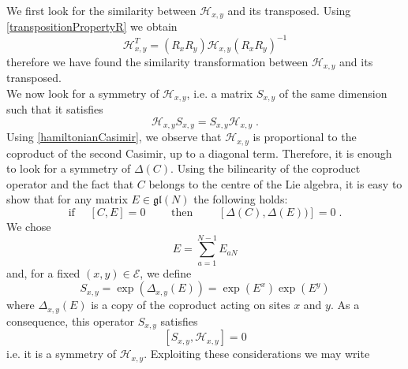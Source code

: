 \documentclass[10pt]{article}
\numberwithin{equation}{section}
\numberwithin{equation}{subsection}
\newcommand{\dt}{\;.}
\begin{document}
We first look for the similarity between $\mathcal{H}_{x,y}$ and its transposed. Using \eqref{transpositionPropertyR} we obtain  
\begin{equation}\label{transpositionPropertyH}
    \mathcal{H}_{x,y}^{T}=\left(R_{x}R_{y}\right)\mathcal{H}_{x,y}\left(R_{x}R_{y}\right)^{-1}
\end{equation}
therefore we have found the similarity transformation between $\mathcal{H}_{x,y}$ and its transposed. \\
We now look for a symmetry of $\mathcal{H}_{x,y}$, i.e. a matrix $S_{x,y}$ of the same dimension such that it satisfies 
\begin{equation}
	\mathcal{H}_{x,y}S_{x,y}=S_{x,y}\mathcal{H}_{x,y}
	\dt
\end{equation}
Using \eqref{hamiltonianCasimir}, we observe that $\mathcal{H}_{x,y}$ is proportional to the coproduct of the second Casimir, up to a diagonal term. Therefore, it is enough to look for a symmetry of $\Delta (C)$. Using the bilinearity of the coproduct operator and the fact that $C$ belongs to the centre of the Lie algebra, it is easy to show that for any matrix $E\in \mathfrak{gl}(N)$ the following holds:
\begin{equation}
 \text{if } \quad	[C,E]=0\qquad  \text{ then }\qquad \left[\Delta (C),\Delta(E)) \right]=0\dt
\end{equation}
We chose 
\begin{equation}
	E=\sum_{a=1}^{N-1}E_{aN}
\end{equation}
and, for a fixed $(x,y)\in \mathcal{E}$, we define
\begin{equation}
	S_{x,y}=\exp{(\Delta_{x,y}(E))}=\exp{(E^{x})}\exp{(E^{y})}
\end{equation}
where $\Delta_{x,y}(E)$ is a copy of the coproduct acting on sites $x$ and $y$. As a consequence, this operator $S_{x,y}$ satisfies
\begin{equation}\label{symmetryH}
	\left[S_{x,y},\mathcal{H}_{x,y}\right]=0
\end{equation}
i.e. it is a symmetry of $\mathcal{H}_{x,y}$. Exploiting these considerations we may write
\end{document}
